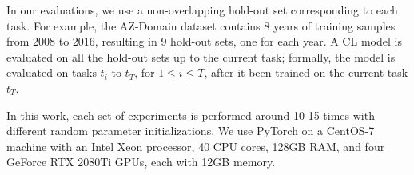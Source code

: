 
In our evaluations, we use a non-overlapping hold-out set corresponding to each task. For example, the AZ-Domain dataset contains 8 years of training samples from 2008 to 2016, resulting in 9 hold-out sets, one for each year. A CL model is evaluated on all the hold-out sets up to the current task; formally, 
the model is evaluated on tasks $t_i$ to $t_{T}$, for $1 \leq i \leq T$, after it been trained on the current task $t_{T}$.

In this work, each set of experiments is performed around 10-15 times with different random parameter initializations. We use PyTorch on a CentOS-7 machine with an Intel Xeon processor, 40 CPU cores, 128GB RAM, and four GeForce RTX 2080Ti GPUs, each with 12GB memory.